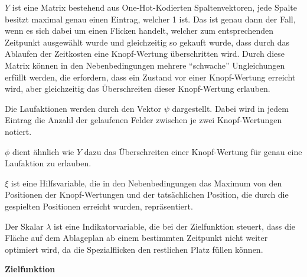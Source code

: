 $Y$ ist eine Matrix bestehend aus One-Hot-Kodierten Spaltenvektoren, \dash jede Spalte besitzt maximal genau einen Eintrag, welcher 1 ist. Das ist genau dann der Fall, wenn es sich dabei um einen Flicken handelt, welcher zum entsprechenden Zeitpunkt ausgewählt wurde und gleichzeitig so gekauft wurde, dass durch das Ablaufen der Zeitkosten eine Knopf-Wertung überschritten wird. Durch diese Matrix können in den Nebenbedingungen mehrere \enquote{schwache} Ungleichungen erfüllt werden, die erfordern, dass ein Zustand vor einer Knopf-Wertung erreicht wird, aber gleichzeitig das Überschreiten dieser Knopf-Wertung erlauben.

Die Laufaktionen werden durch den Vektor $\psi$ dargestellt. Dabei wird in jedem Eintrag die Anzahl der gelaufenen Felder zwischen je zwei Knopf-Wertungen notiert.

$\phi$ dient ähnlich wie $Y$ dazu das Überschreiten einer Knopf-Wertung für genau eine Laufaktion zu erlauben.

$\xi$ ist eine Hilfsvariable, die in den Nebenbedingungen das Maximum von den Positionen der Knopf-Wertungen und der tatsächlichen Position, die durch die gespielten Positionen erreicht wurden, repräsentiert.

Der Skalar $\lambda$ ist eine Indikatorvariable, die bei der Zielfunktion steuert, dass die Fläche auf dem Ablageplan ab einem bestimmten Zeitpunkt nicht weiter optimiert wird, da die Spezialflicken den restlichen Platz füllen können.

\textbf{Zielfunktion}

